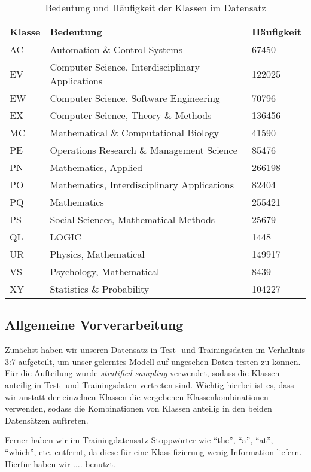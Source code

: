 \begin{table}[h]
    \centering
    \begin{tabular}{l|l|l}
        \textbf{Klasse} & \textbf{Bedeutung} & \textbf{Häufigkeit}\\
        \hline
        AC & Automation \& Control Systems & 67450\\
        EV & Computer Science, Interdisciplinary Applications & 122025\\
        EW & Computer Science, Software Engineering & 70796\\
        EX & Computer Science, Theory \& Methods & 136456\\
        MC & Mathematical \& Computational Biology & 41590\\
        PE & Operations Research \& Management Science & 85476\\
        PN & Mathematics, Applied & 266198\\
        PO & Mathematics, Interdisciplinary Applications & 82404\\
        PQ & Mathematics & 255421\\
        PS & Social Sciences, Mathematical Methods & 25679\\
        QL & LOGIC & 1448\\
        UR & Physics, Mathematical & 149917\\
        VS & Psychology, Mathematical & 8439\\
        XY & Statistics \& Probability & 104227\\
    \end{tabular}
    \caption{Bedeutung und Häufigkeit der Klassen im Datensatz}
    \label{tab:class_meaning}
\end{table}


\subsection{Allgemeine Vorverarbeitung}

Zunächst haben wir unseren Datensatz in Test- und Trainingsdaten im Verhältnis 3:7 aufgeteilt, um unser gelerntes Modell auf ungesehen Daten testen zu können.
Für die Aufteilung wurde \emph{stratified sampling} verwendet, sodass die Klassen anteilig in Test- und Trainingsdaten vertreten sind.
Wichtig hierbei ist es, dass wir anstatt der einzelnen Klassen die vergebenen Klassenkombinationen verwenden, sodass die Kombinationen von Klassen anteilig in den beiden Datensätzen auftreten.

Ferner haben wir im Trainingdatensatz Stoppwörter wie ``the'', ``a'', ``at'', ``which'', etc. entfernt, da diese für eine Klassifizierung wenig Information liefern.
Hierfür haben wir .... benutzt. %

